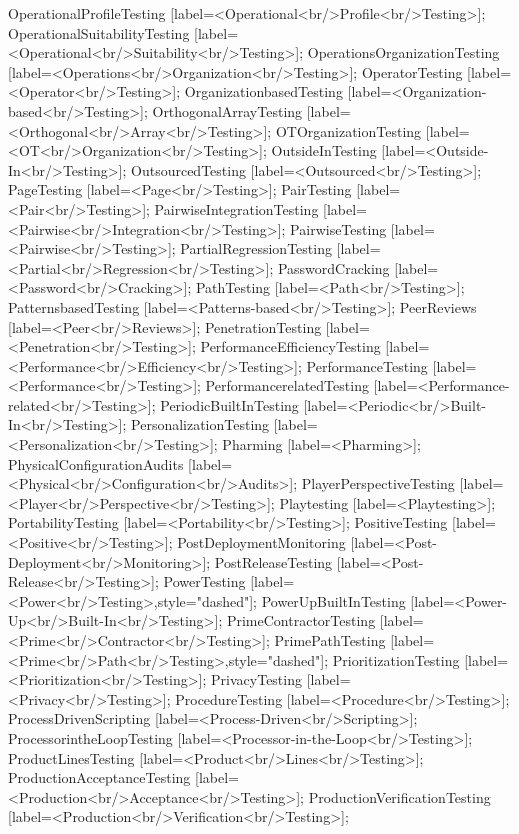 \documentclass{article}
\begin{document}
{OperationalProfileTesting [label=<Operational<br/>Profile<br/>Testing>];
OperationalSuitabilityTesting [label=<Operational<br/>Suitability<br/>Testing>];
OperationsOrganizationTesting [label=<Operations<br/>Organization<br/>Testing>];
OperatorTesting [label=<Operator<br/>Testing>];
OrganizationbasedTesting [label=<Organization-based<br/>Testing>];
OrthogonalArrayTesting [label=<Orthogonal<br/>Array<br/>Testing>];
OTOrganizationTesting [label=<OT<br/>Organization<br/>Testing>];
OutsideInTesting [label=<Outside-In<br/>Testing>];
OutsourcedTesting [label=<Outsourced<br/>Testing>];
PageTesting [label=<Page<br/>Testing>];
PairTesting [label=<Pair<br/>Testing>];
PairwiseIntegrationTesting [label=<Pairwise<br/>Integration<br/>Testing>];
PairwiseTesting [label=<Pairwise<br/>Testing>];
PartialRegressionTesting [label=<Partial<br/>Regression<br/>Testing>];
PasswordCracking [label=<Password<br/>Cracking>];
PathTesting [label=<Path<br/>Testing>];
PatternsbasedTesting [label=<Patterns-based<br/>Testing>];
PeerReviews [label=<Peer<br/>Reviews>];
PenetrationTesting [label=<Penetration<br/>Testing>];
PerformanceEfficiencyTesting [label=<Performance<br/>Efficiency<br/>Testing>];
PerformanceTesting [label=<Performance<br/>Testing>];
PerformancerelatedTesting [label=<Performance-related<br/>Testing>];
PeriodicBuiltInTesting [label=<Periodic<br/>Built-In<br/>Testing>];
PersonalizationTesting [label=<Personalization<br/>Testing>];
Pharming [label=<Pharming>];
PhysicalConfigurationAudits [label=<Physical<br/>Configuration<br/>Audits>];
PlayerPerspectiveTesting [label=<Player<br/>Perspective<br/>Testing>];
Playtesting [label=<Playtesting>];
PortabilityTesting [label=<Portability<br/>Testing>];
PositiveTesting [label=<Positive<br/>Testing>];
PostDeploymentMonitoring [label=<Post-Deployment<br/>Monitoring>];
PostReleaseTesting [label=<Post-Release<br/>Testing>];
PowerTesting [label=<Power<br/>Testing>,style="dashed"];
PowerUpBuiltInTesting [label=<Power-Up<br/>Built-In<br/>Testing>];
PrimeContractorTesting [label=<Prime<br/>Contractor<br/>Testing>];
PrimePathTesting [label=<Prime<br/>Path<br/>Testing>,style="dashed"];
PrioritizationTesting [label=<Prioritization<br/>Testing>];
PrivacyTesting [label=<Privacy<br/>Testing>];
ProcedureTesting [label=<Procedure<br/>Testing>];
ProcessDrivenScripting [label=<Process-Driven<br/>Scripting>];
ProcessorintheLoopTesting [label=<Processor-in-the-Loop<br/>Testing>];
ProductLinesTesting [label=<Product<br/>Lines<br/>Testing>];
ProductionAcceptanceTesting [label=<Production<br/>Acceptance<br/>Testing>];
ProductionVerificationTesting [label=<Production<br/>Verification<br/>Testing>];
}
\end{document}
